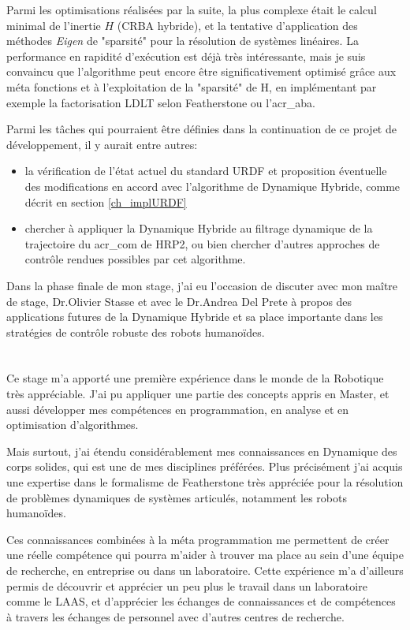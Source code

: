 \documentclass{report}
\begin{document}
Parmi les optimisations réalisées par la suite, la plus complexe était le calcul minimal de l'inertie $H$ (CRBA hybride), et la tentative d'application des méthodes \emph{Eigen} de "sparsité" pour la résolution de systèmes linéaires. La performance en rapidité d'exécution est déjà très intéressante, mais je suis convaincu que l'algorithme peut encore être significativement optimisé grâce aux méta fonctions et à l'exploitation de la "sparsité" de H, en implémentant par exemple la factorisation LDLT selon Featherstone ou l'\gls{acr_aba}.

Parmi les tâches qui pourraient être définies dans la continuation de ce projet de développement, il y aurait entre autres:
\begin{itemize}
\item la vérification de l'état actuel du standard URDF et proposition éventuelle des modifications en accord avec l'algorithme de Dynamique Hybride, comme décrit en section \ref{ch_implURDF}
\item chercher à appliquer la Dynamique Hybride au filtrage dynamique de la trajectoire du \gls{acr_com} de HRP2, ou bien chercher d'autres approches de contrôle rendues possibles par cet algorithme.
\end{itemize}

Dans la phase finale de mon stage, j'ai eu l'occasion de discuter avec mon maître de stage, Dr.Olivier Stasse et avec le Dr.Andrea Del Prete à propos des applications futures de la Dynamique Hybride et sa place importante dans les stratégies de contrôle robuste des robots humanoïdes.


\section*{} %

Ce stage m'a apporté une première expérience dans le monde de la Robotique très appréciable. J'ai pu appliquer une partie des concepts appris en Master, et aussi développer mes compétences en programmation, en analyse et en optimisation d'algorithmes.

Mais surtout, j'ai étendu considérablement mes connaissances en Dynamique des corps solides, qui est une de mes disciplines préférées. Plus précisément  j'ai acquis une expertise dans le formalisme de Featherstone très appréciée pour la résolution de problèmes dynamiques de systèmes articulés, notamment les robots humanoïdes.

Ces connaissances combinées à la méta programmation me permettent de créer une réelle compétence qui pourra m'aider à trouver ma place au sein d'une équipe de recherche, en entreprise ou dans un laboratoire. Cette expérience m'a d'ailleurs permis de découvrir et apprécier un peu plus le travail dans un laboratoire comme le LAAS, et d'apprécier les échanges de connaissances et de compétences à travers les échanges de personnel avec d'autres centres de recherche.
\end{document}

